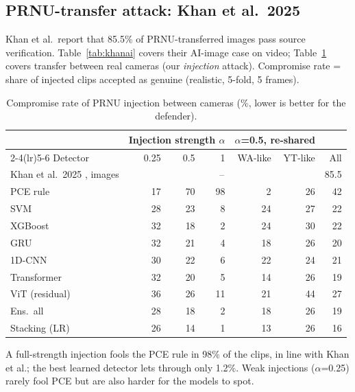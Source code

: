 \documentclass[11pt,a4paper]{article}
\begin{document}
\subsection{PRNU-transfer attack: Khan et al.~2025}
Khan et al.\ report that 85.5\% of PRNU-transferred images pass source verification. Table~\ref{tab:khanai} covers their AI-image case on video; Table~\ref{tab:khancam} covers transfer between real cameras (our \emph{injection} attack). Compromise rate = share of injected clips accepted as genuine (realistic, 5-fold, 5 frames).
\begin{table}[H]\centering\small\caption{Compromise rate of PRNU injection between cameras (\%, lower is better for the defender).}\label{tab:khancam}\begin{tabular}{lrrrrrr}\toprule & \multicolumn{3}{c}{Injection strength $\alpha$} & \multicolumn{2}{c}{$\alpha$=0.5, re-shared} & \\\cmidrule(lr){2-4}\cmidrule(lr){5-6} Detector & 0.25 & 0.5 & 1 & WA-like & YT-like & All \\\midrule
Khan et al.~2025 \cite{khan2025}, images & \multicolumn{5}{c}{--} & 85.5 \\\midrule
PCE rule & 17 & 70 & 98 & 2 & 26 & 42 \\
SVM & 28 & 23 & 8 & 24 & 27 & 22 \\
XGBoost & 32 & 18 & 2 & 24 & 30 & 22 \\
GRU & 32 & 21 & 4 & 18 & 26 & 20 \\
1D-CNN & 30 & 22 & 6 & 22 & 24 & 21 \\
Transformer & 32 & 20 & 5 & 14 & 26 & 19 \\
ViT (residual) & 36 & 26 & 11 & 21 & 44 & 27 \\
Ens.\ all & 28 & 18 & 2 & 18 & 26 & 19 \\
Stacking (LR) & 26 & 14 & 1 & 13 & 26 & 16 \\
\bottomrule\end{tabular}\end{table}
A full-strength injection fools the PCE rule in 98\% of the clips, in line with Khan et al.; the best learned detector lets through only 1.2\%. Weak injections ($\alpha$=0.25) rarely fool PCE but are also harder for the models to spot.
\end{document}
